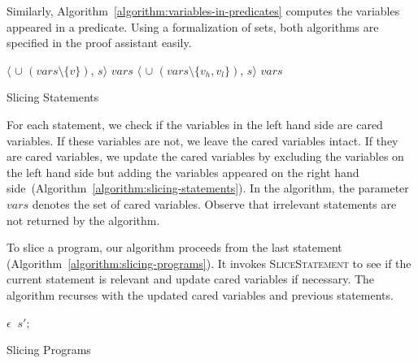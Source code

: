 Similarly, Algorithm~\ref{algorithm:variables-in-predicates} computes
the variables appeared in a predicate. Using a \coq formalization of
sets, both algorithms are specified in the proof assistant easily.

\begin{algorithm}
  \begin{algorithmic}[1]
          {\Return $\langle$ 
            $\cup$ $(\mathit{vars} \setminus \{ v \})$, $s \rangle$}
          {\Return $\mathit{vars}$}
      \EndCase
          {\Return $\langle$ $\cup$ 
            $(\mathit{vars} \setminus \{ v_h, v_l \})$, $s \rangle$}
          {\Return $\mathit{vars}$}
      \EndCase
    \EndMatch
    \EndFunction
  \end{algorithmic}
  \caption{Slicing Statements}
  \label{algorithm:slicing-statements}
\end{algorithm}

For each statement, we check if the variables in the left hand side are
cared variables. If these variables are not, we leave the cared
variables intact. If they are cared variables, we update the cared
variables by excluding the variables on the left hand side but adding
the variables appeared on the right hand
side~(Algorithm~\ref{algorithm:slicing-statements}). In the algorithm, 
the parameter $\mathit{vars}$ denotes the set of cared variables.
Observe that irrelevant statements are not returned by the algorithm.

To slice a program, our algorithm proceeds from the last statement
(Algorithm~\ref{algorithm:slicing-programs}). It invokes
\textsc{SliceStatement} to see if the current statement is relevant
and update cared variables if necessary. The algorithm recurses with
the updated cared variables and previous statements.

\begin{algorithm}
  \begin{algorithmic}[1]
      \Case{$\epsilon$}
        \Return $\epsilon$
      \EndCase
            \Return {}
          \EndCase
            \Return {}$\ s';$
          \EndCase
        \EndMatch
      \EndCase
    \EndMatch
    \EndFunction
  \end{algorithmic}
  \caption{Slicing Programs}
  \label{algorithm:slicing-programs}
\end{algorithm}

